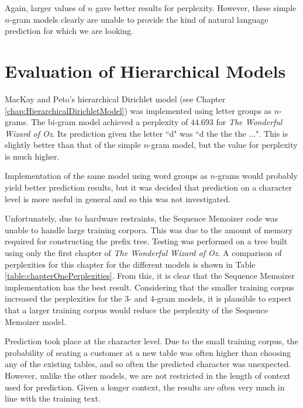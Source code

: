 Again, larger values of $n$ gave better results for perplexity. However, these simple $n$-gram models clearly are unable to provide the kind of natural language prediction for which we are looking.

\section{Evaluation of Hierarchical Models}

MacKay and Peto's hierarchical Dirichlet model (see Chapter \ref{chap:HierarchicalDirichletModel}) was implemented using letter groups as $n$-grams. The bi-gram model achieved a perplexity of 44.693 for \textit{The Wonderful Wizard of Oz}. Its prediction given the letter ``d" was ``d the the the ...". This is slightly better than that of the simple $n$-gram model, but the value for perplexity is much higher. 

Implementation of the same model using word groups as $n$-grams would probably yield better prediction results, but it was decided that prediction on a character level is more useful in general and so this was not investigated.

Unfortunately, due to hardware restraints, the Sequence Memoizer code was unable to handle large training corpora. This was due to the amount of memory required for constructing the prefix tree. Testing was performed on a tree built using only the first chapter of \textit{The Wonderful Wizard of Oz}. A comparison of perplexities for this chapter for the different models is shown in Table \ref{table:chapterOnePerplexities}. From this, it is clear that the Sequence Memoizer implementation has the best result. Considering that the smaller training corpus increased the perplexities for the 3- and 4-gram models, it is plausible to expect that a larger training corpus would reduce the perplexity of the Sequence Memoizer model.

Prediction took place at the character level. Due to the small training corpus, the probability of seating a customer at a new table was often higher than choosing any of the existing tables, and so often the predicted character was unexpected. However, unlike the other models, we are not restricted in the length of context used for prediction. Given a longer context, the results are often very much in line with the training text. 

